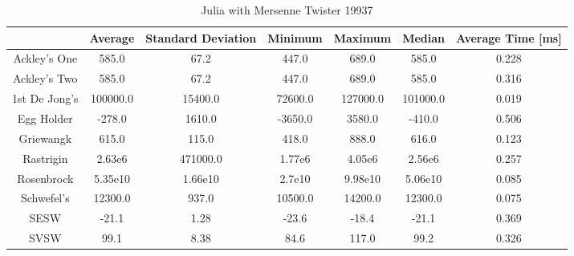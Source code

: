 \documentclass{article}
\begin{document}
            \begin{table}[h!]
                \begin{centering}
                    \begin{tabular}{|c||c|c|c|c|c|c|}
                        \hline
                                    & Average & Standard Deviation & Minimum & Maximum & Median & Average Time [ms] \\
                        \hline
                        \hline
                        Ackley's One & 585.0  & 67.2               & 447.0   & 689.0   & 585.0  & 0.228 \\
                        \hline
                        Ackley's Two & 585.0  & 67.2               & 447.0   & 689.0   & 585.0  & 0.316 \\
                        \hline
                        1st De Jong's & 100000.0 & 15400.0         & 72600.0 & 127000.0 & 101000.0 & 0.019 \\
                        \hline
                        Egg Holder    & -278.0   & 1610.0          & -3650.0 & 3580.0   & -410.0   & 0.506 \\
                        \hline
                        Griewangk     & 615.0    & 115.0           & 418.0   & 888.0    & 616.0    & 0.123 \\
                        \hline
                        Rastrigin     & 2.63e6   & 471000.0        & 1.77e6  & 4.05e6   & 2.56e6   & 0.257 \\
                        \hline
                        Rosenbrock    & 5.35e10  & 1.66e10         & 2.7e10  & 9.98e10  & 5.06e10  & 0.085\\
                        \hline
                        Schwefel's    & 12300.0  & 937.0           & 10500.0 & 14200.0  & 12300.0  & 0.075 \\
                        \hline
                        SESW          & -21.1    & 1.28            & -23.6   & -18.4    & -21.1    & 0.369\\
                        \hline
                        SVSW          & 99.1     & 8.38            & 84.6    & 117.0    & 99.2     & 0.326 \\
                        \hline
                    \end{tabular}
                    \caption{Julia with Mersenne Twister 19937}
                \end{centering}
                \end{table}
\end{document}
